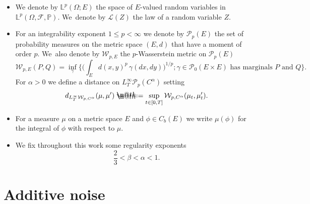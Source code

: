 \documentclass[JEP,XML,SOM,Unicode,published]{cedram}
\makeatletter
\theoremstyle{definition}
\newcommand{\mcF}{\mathcal{F}}
\newcommand{\mcP}{\mathcal{P}}
\newcommand\mcW{\mathcal W}
\newcommand{\bbL}{\mathbb{L}}
\newcommand{\bbP}{\mathbb{P}}
\newcommand*{\defeq}{\mathrel{\rlap{%
\raisebox{0.3ex}{$\m@th\cdot$}}%
\raisebox{-0.3ex}{$\m@th\cdot$}}%
=}
\newcommand{\dw}{d_{L_T^\infty\mathcal{W}_{p,C^\alpha}}}
\makeatother
\begin{document}
\begin{itemize}
\item
We denote by $\bbL^p(\Omega; E)$ the space of $E$-valued random variables in $\bbL^p(\Omega,\mcF,\bbP)$. We~denote by $\mathcal{L}(Z)$ the law of a random variable $Z$.

\item
For an integrability exponent $1\leq p<\infty$ we denote by $\mcP_p(E)$ the set of probability measures on the metric space $(E,d)$ that have a moment of order $p$. We~also denote by $\mcW_{p,E}$ the $p$-Wasserstein metric on $\mcP_p(E)$
\[
\mcW_{p,E}(P,Q) = \inf_\gamma\textstyle\bigl\{\bigl(\int_E d(x,y)^p \,\gamma(dx,dy)\bigr)^{1/p};
\gamma\in\mcP_0(E\!\times\! E) \textrm{ has marginals } P \textrm{ and } Q\bigr\}.
\]
For $\alpha>0$ we define a distance on $L^\infty_T\mathcal{P}_p(C^\alpha)$ setting
\[
\dw(\mu,\mu') \defeq \sup_{t\in[0, T]} \mathcal{W}_{p,C^\alpha}(\mu_t,\mu'_t).
\]

\item
For a measure $\mu$ on a metric space $E$ and $\phi\in C_b(E)$ we write $\mu(\phi)$ for the integral of $\phi$ with respect to $\mu$.

\item
We fix throughout this work some regularity exponents
\begin{equation} \label{EqConditionAlphaBeta}
\frac{2}{3}<\beta<\alpha<1.
\end{equation}
\end{itemize}

\section{Additive noise}
\label{SectionAdditiveNoise}
\end{document}
